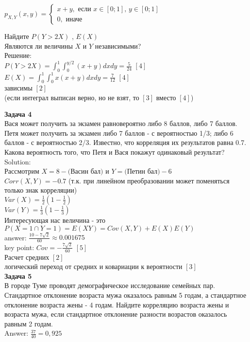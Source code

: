 \documentclass[pdftex,12pt,a4paper]{article}
\begin{document}
$p_{X,Y} \left(x,y\right)=\left\{\begin{array}{l} {x+y,
\text{ если } x\in \left[0;1\right],\, y\in \left[0;1\right]} \\
{0,\text{ иначе} } \end{array}\right. $

Найдите  $P\left(Y>2X\right)$ ,  $E\left(X\right)$ \\
Являются ли величины $X$ и $Y$ независимыми? \\
Решение: \\
$P(Y>2X)=\int_{0}^{1}\int_{0}^{y/2}(x+y)dxdy=\frac{5}{24}$ $[4]$\\
$E(X)=\int_{0}^{1}\int_{0}^{1}x(x+y)dxdy=\frac{7}{12}$ $[4]$\\
зависимы $[2]$ \\
(если интеграл выписан верно, но не взят, то $[3]$ вместо $[4]$) \\

\newpage

\textbf{Задача 4} \\ 
Вася может получить за экзамен равновероятно либо 8 баллов, либо 7 баллов. Петя может получить за экзамен либо 7 баллов - с вероятностью 1/3; либо 6 баллов - с вероятностью 2/3. Известно, что корреляция их результатов равна 0.7. \\
Какова вероятность того, что Петя и Вася покажут одинаковый результат? \\
Solution: \\
Рассмотрим $X=8-($Васин бал$)$ и $Y=($Петин бал$)-6$ \\
$Corr(X,Y)=-0.7$ (т.к. при линейном преобразовании может поменяться только знак корреляции) \\
$Var(X)=\frac{1}{2}(1-\frac{1}{2})$ \\
$Var(Y)=\frac{1}{3}(1-\frac{1}{3})$ \\
Интересующая нас величина - это $P(X=1\cap Y=1)=E(XY)=Cov(X,Y)+E(X)E(Y)$ \\
answer: $\frac{10-7\sqrt{2}}{60}\approx 0.001675$ \\
key point: $Cov=-\frac{7\sqrt{2}}{60}$ $[5]$ \\
Расчет средних $[2]$ \\
логический переход от средних и ковариации к вероятности $[3]$ \\


\textbf{Задача 5} \\ %
В городе Туме проводят демографическое исследование семейных пар. Стандартное отклонение возраста мужа оказалось равным 5 годам, а стандартное отклонение возраста жены - 4 годам. Найдите корреляцию возраста жены и возраста мужа, если стандартное отклонение разности возрастов оказалось равным 2 годам. \\
Answer: $\frac{37}{40}=0,925$ \\
\end{document}
